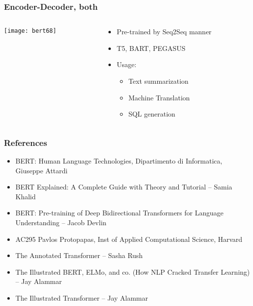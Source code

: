 \begin{frame}[fragile]\frametitle{Encoder-Decoder, both}

\begin{columns}
    \begin{column}[T]{0.5\linewidth}
			\begin{center}
			\texttt{[image: bert68]}
			\end{center}		
		\end{column}
    \begin{column}[T]{0.5\linewidth}
      \begin{itemize}
			\item Pre-trained by Seq2Seq manner
			\item T5, BART, PEGASUS
			\item Usage:
      \begin{itemize}
			\item Text summarization
			\item Machine Translation
			\item SQL generation
			\end{itemize}
			\end{itemize}
    \end{column}
  \end{columns}
			
\end{frame}


\begin{frame}[fragile]\frametitle{References}
		\begin{itemize}
		\item BERT: Human Language Technologies, Dipartimento di Informatica, Giuseppe Attardi
		\item BERT Explained: A Complete Guide with Theory and Tutorial – Samia Khalid
		\item BERT: Pre-training of Deep Bidirectional Transformers for Language Understanding – Jacob Devlin
		\item AC295 Pavlos Protopapas, Inst of Applied Computational Science, Harvard
		\item The Annotated Transformer – Sasha Rush
		\item The Illustrated BERT, ELMo, and co. (How NLP Cracked Transfer Learning) – Jay Alammar
		\item The Illustrated Transformer – Jay Alammar
		\end{itemize}
\end{frame}






